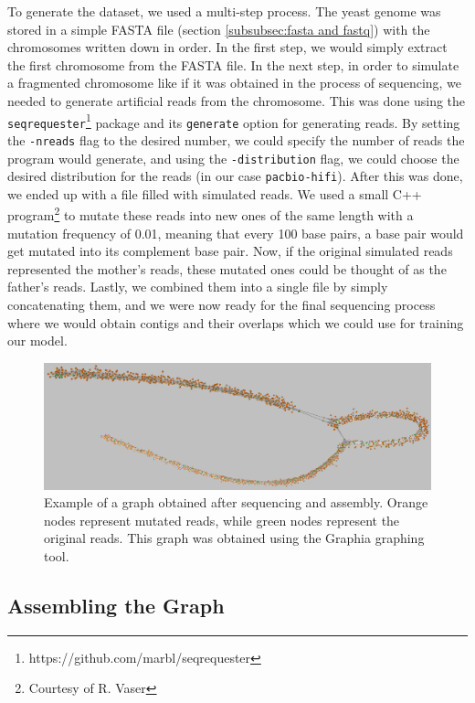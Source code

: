 \documentclass[times, utf8, diplomski, english]{fer_eng}
\begin{document}
To generate the dataset, we used a multi-step process. The yeast genome was stored in a simple FASTA file (section \ref{subsubsec:fasta and fastq}) with the chromosomes written down in order. In the first step, we would simply extract the first chromosome from the FASTA file. In the next step, in order to simulate a fragmented chromosome like if it was obtained in the process of sequencing, we needed to generate artificial reads from the chromosome. This was done using the \texttt{seqrequester}\footnote{https://github.com/marbl/seqrequester} package and its \texttt{generate} option for generating reads. By setting the \texttt{-nreads} flag to the desired number, we could specify the number of reads the program would generate, and using the \texttt{-distribution} flag, we could choose the desired distribution for the reads (in our case \texttt{pacbio-hifi}). After this was done, we ended up with a file filled with simulated reads. We used a small C++ program\footnote{Courtesy of R. Vaser} to mutate these reads into new ones of the same length with a mutation frequency of 0.01, meaning that every 100 base pairs, a base pair would get mutated into its complement base pair. Now, if the original simulated reads represented the mother's reads, these mutated ones could be thought of as the father's reads. Lastly, we combined them into a single file by simply concatenating them, and we were now ready for the final sequencing process where we would obtain contigs and their overlaps which we could use for training our model.

\begin{figure}[h]
	\centering
	\includegraphics[width=\textwidth]{images/graph_example.png}
	\caption[Graph]{Example of a graph obtained after sequencing and assembly. Orange nodes represent mutated reads, while green nodes represent the original reads. This graph was obtained using the Graphia\footnotemark{} graphing tool.}
	\label{fig:graph}
\end{figure}

\subsection{Assembling the Graph}
\label{subsec:assembling the graph}
\end{document}
